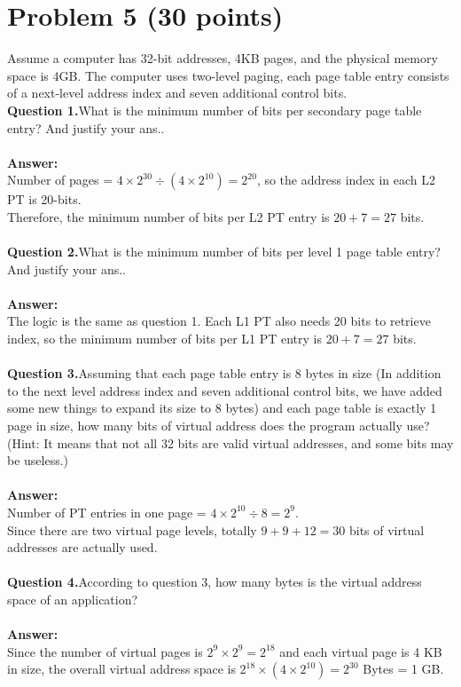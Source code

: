 \documentclass[answers]{exam}
\begin{document}
\section*{Problem 5 (30 points)}
Assume a computer has 32-bit addresses, 4KB pages, and the physical memory space is 4GB. The computer uses two-level paging, each page table entry consists of a next-level address index and seven additional control bits.
\\\textbf{Question 1.}What is the minimum number of bits per secondary page table entry? And justify your ans..\\
\\
\textbf{Answer:}\\
Number of pages = $4\times 2^{30}\div(4\times 2^{10})=2^{20}$, so the address index in each L2 PT is 20-bits.\\
Therefore, the minimum number of bits per L2 PT entry is $20+7=27$ bits.
\\
\\\textbf{Question 2.}What is the minimum number of bits per level 1 page table entry? And justify your ans..\\
\\
\textbf{Answer:}\\
The logic is the same as question 1. Each L1 PT also needs 20 bits to retrieve index, so the minimum number of bits per L1 PT entry is $20+7=27$ bits.
\\
\\\textbf{Question 3.}Assuming that each page table entry is 8 bytes in size (In addition to the next level address index and seven additional control bits, we have added some new things to expand its size to 8 bytes) and each page table is exactly 1 page in size, how many bits of virtual address does the program actually use?
(Hint: It means that not all 32 bits are valid virtual addresses, and some bits may be useless.)\\
\\
\textbf{Answer:}\\
Number of PT entries in one page = $4\times 2^{10}\div 8=2^9$.\\
Since there are two virtual page levels, totally $9+9+12=30$ bits of virtual addresses are actually used.
\\
\\\textbf{Question 4.}According to question 3, how many bytes is the virtual address space of an application?\\
\\
\textbf{Answer:}\\
Since the number of virtual pages is $2^9\times 2^9=2^{18}$ and each virtual page is 4 KB in size, the overall virtual address space is $2^{18}\times (4\times 2^{10})=2^{30}$ Bytes = 1 GB.
\end{document}
